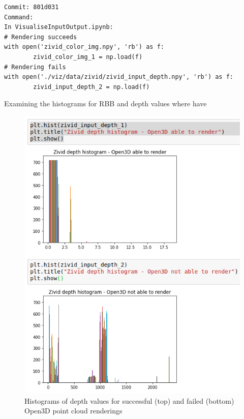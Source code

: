 \label{app_res:13}
\begin{verbatim}
Commit: 801d031
Command: 
In VisualiseInputOutput.ipynb:
# Rendering succeeds
with open('zivid_color_img.npy', 'rb') as f:
        zivid_color_img_1 = np.load(f)   
# Rendering fails
with open('./viz/data/zivid/zivid_input_depth.npy', 'rb') as f:
        zivid_input_depth_2 = np.load(f) 
\end{verbatim}

Examining the histograms for RBB and depth values where have 

\begin{figure}[h!]
\centering
\includegraphics[width=\textwidth]{Figures/ZividOneHistogramsSuccessFailure.png}
\caption{Histograms of depth values for successful (top) and failed (bottom) Open3D point cloud renderings}
\label{fig:ZividOneHistogramsSuccessFailure}
\end{figure}

